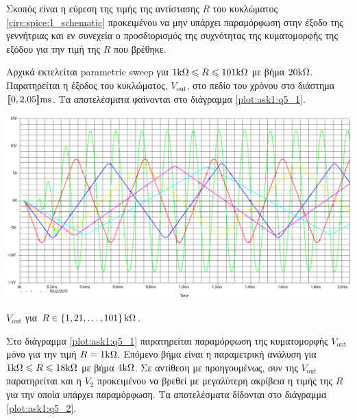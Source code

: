 Σκοπός είναι η εύρεση της τιμής της αντίστασης $R$ του κυκλώματος \ref{circ:spice:1_schematic} προκειμένου να μην υπάρχει παραμόρφωση στην έξοδο της γεννήτριας και εν συνεχεία ο προσδιορισμός της συχνότητας της κυματομορφής της εξόδου για την τιμή της $R$ που βρέθηκε.\par
Αρχικά εκτελείται parametric sweep για $1\kohm\leqslant R\leqslant 101\kohm$ με βήμα $20\kohm$. Παρατηρείται η έξοδος του κυκλώματος, $V_{\mathrm{out}}$, στο πεδίο του χρόνου στο διάστημα $\lb 0,2.05 \rb\unit{\milli\second}$. Τα αποτελέσματα φαίνονται στο διάγραμμα \ref{plot:ask1:q5_1}.

\begin{chart}[H]
	\begin{center}
		\includegraphics[width=15cm]{spice_01/q5_1.pdf}
		\caption{$V_{\mathrm{out}}$ για $R\in\left\{1,21,\ldots,101\right\}\kohm$.}
		\label{plot:ask1:q5_1}
	\end{center}
\end{chart}

Στο διάγραμμα \ref{plot:ask1:q5_1} παρατηρείται παραμόρφωση της κυματομορφής $V_{\mathrm{out}}$ μόνο για την τιμή $R=1\kohm$. Επόμενο βήμα είναι η παραμετρική ανάλυση για $1\kohm\leqslant R\leqslant 18\kohm$ με βήμα $4\kohm$. Σε αντίθεση με προηγουμένως, συν της $V_{\mathrm{out}}$ παρατηρείται και η $V_2$ προκειμένου να βρεθεί με μεγαλύτερη ακρίβεια η τιμής της $R$ για την οποία υπάρχει παραμόρφωση. Τα αποτελέσματα δίδονται στο διάγραμμα \ref{plot:ask1:q5_2}.


